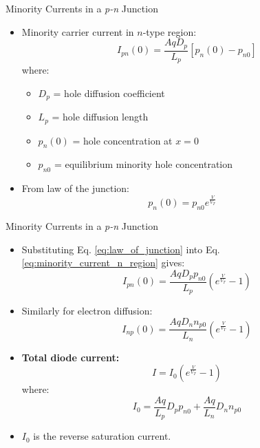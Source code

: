 \begin{frame}{Minority Currents in a \textit{p-n} Junction}
	\begin{itemize}
\item Minority carrier current in $n$-type region:
\begin{equation} \label{eq:minority_current_n_region}
	I_{pn}(0) = \frac{AqD_p}{L_p} \left[ p_n(0) - p_{n0} \right]
\end{equation}
where:
\begin{itemize}
	\item $D_p$ = hole diffusion coefficient
	\item $L_p$ = hole diffusion length
	\item $p_n(0)$ = hole concentration at $x = 0$
	\item $p_{n0}$ = equilibrium minority hole concentration
\end{itemize}
\item From law of the junction:
\begin{equation} \label{eq:law_of_junction}
	p_n(0) = p_{n0} e^{\frac{V}{V_T}} \quad
\end{equation}
\end{itemize}

\end{frame}

\begin{frame}{Minority Currents in a \textit{p-n} Junction}
	\begin{itemize}
	\item Substituting Eq. \ref{eq:law_of_junction} into Eq. \ref{eq:minority_current_n_region} gives:
	\begin{equation}
		I_{pn}(0) = \frac{AqD_p p_{n0}}{L_p} \left( e^{\frac{V}{V_T}} - 1 \right)
	\end{equation}

	\item Similarly for electron diffusion:
	\begin{equation}
		I_{np}(0) = \frac{AqD_n n_{p0}}{L_n} \left( e^{\frac{V}{V_T}} - 1 \right)
	\end{equation}

	\item \textbf{Total diode current:}
	\begin{equation}
		I = I_0 \left( e^{\frac{V}{V_T}} - 1 \right)
	\end{equation}
	where:
	\begin{equation*}
		I_0 = \frac{Aq}{L_p} D_p p_{n0} + \frac{Aq}{L_n} D_n n_{p0}
	\end{equation*}
	\item $I_0$ is the reverse saturation current.
	\end{itemize}
\end{frame}	

